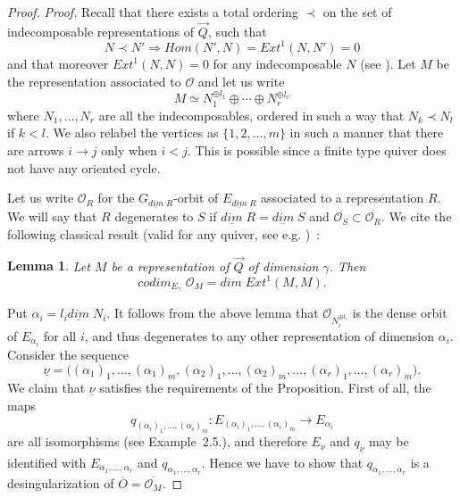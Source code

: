 \documentclass[a4paper,10pt]{amsart}
\def\a{\alpha}
\newtheorem{lem}[theo]{Lemma}
\numberwithin{equation}{section}
\begin{document}
\begin{proof}
\noindent
\textit{Proof.} Recall that there exists a total ordering $\prec$ on the set of indecomposable representations of $\vec{Q}$, such that
$$N \prec N' \Rightarrow Hom(N',N) = Ext^1(N,N')=0$$
and that moreover $Ext^1(N,N)=0$ for any indecomposable $N$ (see \cite[Lemma~3.19.]{Trieste} ). Let $M$ be the representation associated to $\mathcal{O}$ and let us write
\begin{equation}
M \simeq N_1^{\oplus l_1} \oplus \cdots \oplus N_r^{\oplus l_r}
\end{equation}
where $N_1, \ldots, N_r$ are all the indecomposables, ordered in such a way that $N_k \prec N_l$ if $k <l$. We also relabel the vertices as $\{1, 2, \ldots, m\}$ in such a manner that there are arrows $i \to j$ only when $i<j$. This is possible since a finite type quiver does not have any oriented cycle.

Let us write $\mathcal{O}_R$ for the $G_{\underline{dim}\;R}$-orbit of $E_{\underline{dim}\;R}$ associated to a representation $R$. We will say that $R$ degenerates to $S$ if $\underline{dim}\;R=\underline{dim}\;S$ and $\mathcal{O}_S \subset \overline{\mathcal{O}_R}$. We cite the following classical result (valid for any quiver, see e.g. \cite{Brion})~:
\begin{lem}\label{L:codim} Let $M$ be a representation of $\vec{Q}$ of dimension $\gamma$. Then 
$$codim_{E_{\gamma}}\;\mathcal{O}_M = dim\;Ext^1(M,M).$$
\end{lem}
Put $\a_i=l_i \underline{dim}\;N_i$. It follows from the above lemma that $\mathcal{O}_{N_i^{\oplus l_i}}$ is the dense orbit of $E_{\a_i}$ for all $i$, and thus degenerates to any other representation of dimension $\a_i$. Consider the sequence
$$\underline{\nu}=\big( (\a_1)_1, \ldots, (\a_1)_m, (\a_2)_1, \ldots, (\a_2)_m, \ldots, (\a_r)_1, \ldots, (\a_r)_m\big).$$
We claim that $\underline{\nu}$ satisfies the requirements of the Proposition. First of all, the maps 
$$q_{(\a_i)_1, \ldots, (\a_i)_m}: E_{(\a_i)_1, \ldots, (\a_i)_m} \to E_{\a_i}$$
are all isomorphisms (see Example~2.5.), and therefore $E_{\underline{\nu}}$ and $q_{\underline{\nu}}$ may be identified with $E_{\a_1, \ldots, \a_r}$ and $q_{\a_1, \ldots, \a_r}$. Hence we have to show that $q_{\a_1, \ldots, \a_r}$ is a desingularization of $\overline{O}=\overline{\mathcal{O}_M}$.

\vspace{.1in}


\end{proof}
\end{document}
